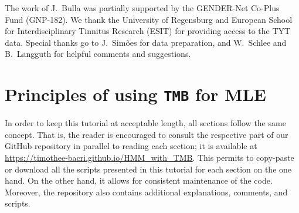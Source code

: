 \documentclass[bimj,fleqn]{w-art}\usepackage[]{graphicx}\usepackage[]{color}
\theoremstyle{plain}
\theoremstyle{definition}
\begin{document}
% 


\begin{acknowledgement}
The work of J.~Bulla was partially supported by the GENDER-Net Co-Plus Fund (GNP-182). We thank the University of Regensburg and European School for Interdisciplinary Tinnitus Research (ESIT) for providing access to the TYT data. Special thanks go to J.~Sim\~{o}es for data preparation, and W.~Schlee and B.~Langguth for helpful comments and suggestions.
\end{acknowledgement}

\vspace*{1pc}





\section{Principles of using {\tt{TMB}} for MLE}
\label{sec:principles}

In order to keep this tutorial at acceptable length, all sections follow the same concept. That is, the reader is encouraged to consult the respective part of our GitHub repository in parallel to reading each section; it is available at \underline{\url{https://timothee-bacri.github.io/HMM_with_TMB}}. This permits to copy-paste or download all the scripts presented in this tutorial for each section on the one hand. On the other hand, it allows for consistent maintenance of the code. Moreover, the repository also contains additional explanations, comments, and scripts.
\end{document}
